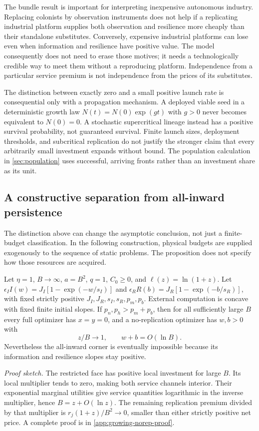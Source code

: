 The bundle result is important for interpreting inexpensive autonomous
industry. Replacing colonists by observation instruments does not help
if a replicating industrial platform supplies both observation and
resilience more cheaply than their standalone substitutes. Conversely,
expensive industrial platforms can lose even when information and
resilience have positive value. The model consequently does not need
to erase those motives; it needs a technologically credible way to meet
them without a reproducing platform. Independence from a particular
service premium is not independence from the prices of its substitutes.

The distinction between exactly zero and a small positive launch rate
is consequential only with a propagation mechanism. A deployed viable
seed in a deterministic growth law $N(t)=N(0)\exp(g t)$ with $g>0$ never
becomes equivalent to $N(0)=0$. A stochastic supercritical lineage instead
has a positive survival probability, not guaranteed survival. Finite
launch sizes, deployment thresholds, and subcritical replication do not
justify the stronger claim that every arbitrarily small investment expands
without bound. The population calculation in \cref{sec:population} uses
successful, arriving fronts rather than an investment share as its unit.


\subsection{A constructive separation from all-inward persistence}
The distinction above can change the asymptotic conclusion, not just a
finite-budget classification. In the following construction, physical
budgets are supplied exogenously to the sequence of static problems.
The proposition does not specify how those resources are acquired.

\begin{corollary}
\label{cor:growing-no-replication}
Let $\eta=1$, $B\to\infty$, $a=B^2$, $q=1$, $C_0\geq0$, and
$\ell(z)=\ln(1+z)$. Let
$\epsilon_I I(w)=J_I[1-\exp(-w/s_I)]$ and
$\epsilon_R R(b)=J_R[1-\exp(-b/s_R)]$, with fixed strictly positive
$J_I,J_R,s_I,s_R,p_m,p_b$. External computation is concave with fixed
finite initial slopes. If $p_n,p_h>p_m+p_b$, then for all sufficiently
large $B$ every full optimizer has $x=y=0$, and a no-replication optimizer
has $w,b>0$ with
\[
 z/B\longrightarrow1,\qquad w+b=O(\ln B).
\]
Nevertheless the all-inward corner is eventually impossible because its
information and resilience slopes stay positive.
\end{corollary}
\noindent\emph{Proof sketch.}
The restricted face has positive local investment for large $B$.
Its local multiplier tends to zero, making both service channels interior.
Their exponential marginal utilities give service quantities logarithmic
in the inverse multiplier, hence $B=z+O(\ln z)$. The remaining replication
premium divided by that multiplier is $r_j(1+z)/B^2\to0$, smaller than
either strictly positive net price. A complete proof is in
\cref{app:growing-norep-proof}.

